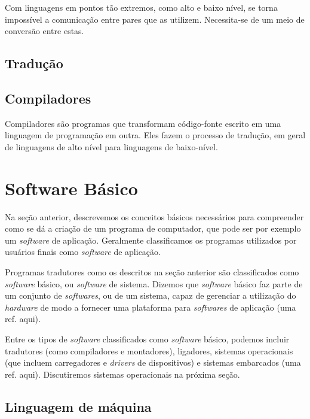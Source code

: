Com linguagens em pontos tão extremos, como alto e baixo nível, se torna
impossível a comunicação entre pares que as utilizem. Necessita-se de um meio
de conversão entre estas.

\subsection{Tradução}




\subsection{Compiladores}

Compiladores são programas que transformam código-fonte escrito em uma linguagem
de programação em outra. Eles fazem o processo de tradução, em geral de
linguagens de alto nível para linguagens de baixo-nível.

\section{Software Básico}

Na seção anterior, descrevemos os conceitos básicos necessários para compreender como se dá a criação de um programa de computador, que pode ser por exemplo um \textit{software} de aplicação. Geralmente classificamos os programas utilizados por usuários finais como \textit{software} de aplicação.

Programas tradutores como os descritos na seção anterior são classificados como \textit{software} básico, ou \textit{software} de sistema. Dizemos que \textit{software} básico faz parte de um conjunto de \textit{softwares}, ou de um sistema, capaz de gerenciar a utilização do \textit{hardware} de modo a fornecer uma plataforma para \textit{softwares} de aplicação (uma ref. aqui).

Entre os tipos de \textit{software} classificados como \textit{software} básico, podemos incluir tradutores (como compiladores e montadores), ligadores, sistemas operacionais (que incluem carregadores e \textit{drivers} de dispositivos) e sistemas embarcados (uma ref. aqui). Discutiremos sistemas operacionais na próxima seção.

\subsection{Linguagem de máquina}

